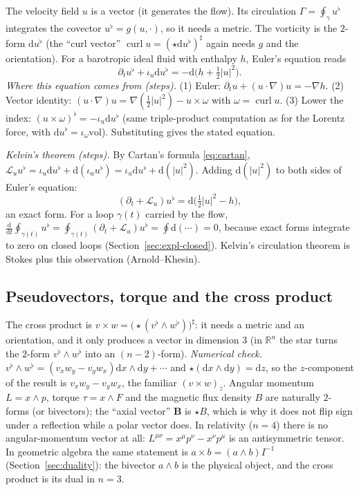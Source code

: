 \documentclass[11pt,a4paper]{article}
\numberwithin{equation}{section}
\theoremstyle{definition}
\theoremstyle{plain}
\newcommand{\numcheck}{\textit{Numerical check.}\ }
\newcommand{\R}{\mathbb{R}}
\newcommand{\dd}{\mathrm{d}}
\newcommand{\vol}{\mathrm{vol}}
\newcommand{\Lie}{\mathcal{L}}
\newcommand{\pss}{I}
\newcommand{\hodge}{\star}
\begin{document}
The velocity field $u$ is a vector (it generates the flow). Its circulation $\Gamma=\oint_\gamma u^\flat$ integrates the covector $u^\flat=g(u,\cdot)$, so it needs a metric. The vorticity is the $2$-form $\dd u^\flat$ (the ``curl vector'' $\operatorname{curl}u=(\hodge\dd u^\flat)^\sharp$ again needs $g$ and the orientation). For a barotropic ideal fluid with enthalpy $h$, Euler's equation reads
\begin{equation}\label{eq:euler}
\partial_tu^\flat+\iota_u\dd u^\flat=-\dd\bigl(h+\tfrac12|u|^2\bigr).
\end{equation}
\emph{Where this equation comes from (steps).} (1) Euler: $\partial_tu+(u\cdot\nabla)u=-\nabla h$. (2) Vector identity: $(u\cdot\nabla)u=\nabla(\frac12|u|^2)-u\times\omega$ with $\omega=\operatorname{curl}u$. (3) Lower the index: $(u\times\omega)^\flat=-\iota_u\dd u^\flat$ (same triple-product computation as for the Lorentz force, with $\dd u^\flat=\iota_\omega\vol$). Substituting gives the stated equation.

\emph{Kelvin's theorem (steps).} By Cartan's formula \eqref{eq:cartan}, $\Lie_uu^\flat=\iota_u\dd u^\flat+\dd(\iota_uu^\flat)=\iota_u\dd u^\flat+\dd(|u|^2)$. Adding $\dd(|u|^2)$ to both sides of Euler's equation:
\[
(\partial_t+\Lie_u)u^\flat=\dd\bigl(\tfrac12|u|^2-h\bigr),
\]
an exact form. For a loop $\gamma(t)$ carried by the flow, $\frac{\dd}{\dd t}\oint_{\gamma(t)}u^\flat=\oint_{\gamma(t)}(\partial_t+\Lie_u)u^\flat=\oint\dd(\cdots)=0$, because exact forms integrate to zero on closed loops (Section~\ref{sec:expl-closed}). Kelvin's circulation theorem is Stokes plus this observation (Arnold--Khesin).

\subsection{Pseudovectors, torque and the cross product}\label{sec:phys-cross}

The cross product is $v\times w=\bigl(\hodge(v^\flat\wedge w^\flat)\bigr)^\sharp$: it needs a metric and an orientation, and it only produces a vector in dimension $3$ (in $\R^n$ the star turns the $2$-form $v^\flat\wedge w^\flat$ into an $(n-2)$-form).
\numcheck $v^\flat\wedge w^\flat=(v_xw_y-v_yw_x)\dd x\wedge\dd y+\cdots$ and $\hodge(\dd x\wedge\dd y)=\dd z$, so the $z$-component of the result is $v_xw_y-v_yw_x$, the familiar $(v\times w)_z$.
Angular momentum $L=x\wedge p$, torque $\tau=x\wedge F$ and the magnetic flux density $B$ are naturally $2$-forms (or bivectors); the ``axial vector'' $\mathbf B$ is $\hodge B$, which is why it does not flip sign under a reflection while a polar vector does. In relativity ($n=4$) there is no angular-momentum vector at all: $L^{\mu\nu}=x^\mu p^\nu-x^\nu p^\mu$ is an antisymmetric tensor.
In geometric algebra the same statement is $a\times b=(a\wedge b)\pss^{-1}$ (Section~\ref{sec:duality}): the bivector $a\wedge b$ is the physical object, and the cross product is its dual in $n=3$.
\end{document}
